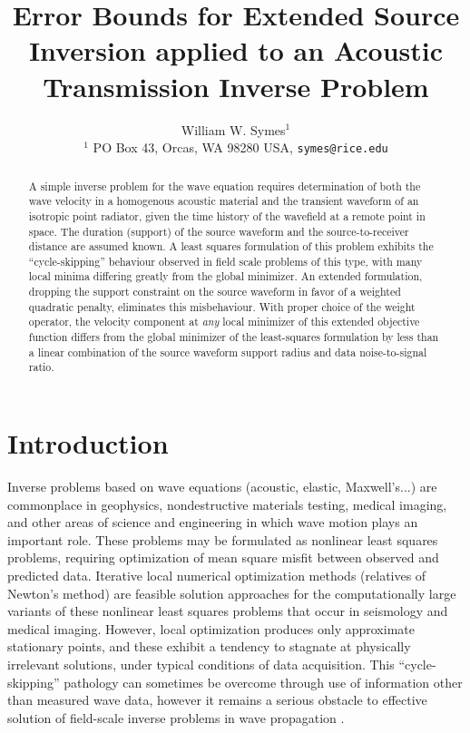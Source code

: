 \title{Error Bounds for Extended Source Inversion applied to an Acoustic Transmission Inverse Problem}
\author[Symes]{William W. Symes$^1$\\
$^1$ PO Box 43, Orcas, WA 98280 USA, {\tt symes@rice.edu}}

\maketitle
\begin{abstract}
  A simple inverse problem for the wave equation requires
  determination of both the wave velocity in a homogenous acoustic
  material and the transient waveform of an isotropic point radiator,
  given the time history of the wavefield at a remote point in
  space. The duration (support) of the source waveform and the
  source-to-receiver distance are assumed known. A least squares
  formulation of this problem exhibits the ``cycle-skipping''
  behaviour observed in field scale problems of this type, with many
  local minima differing greatly from the global minimizer. An
  extended formulation, dropping the support constraint on the source
  waveform in favor of a weighted quadratic penalty, eliminates this
  misbehaviour. With proper choice of the weight operator, the
  velocity component at {\em any} local minimizer of this extended
  objective function differs from the global
  minimizer of the least-squares formulation by less than a linear
  combination of the source waveform support radius and data
  noise-to-signal ratio.

\end{abstract}

\section{Introduction}
Inverse problems based on wave equations (acoustic, elastic,
Maxwell's...) are commonplace in geophysics, nondestructive materials
testing, medical imaging, and other areas of science and engineering
in which wave motion plays an important role. These problems may be
formulated as nonlinear least squares problems, requiring optimization
of mean square misfit between observed and predicted data. Iterative
local numerical optimization methods (relatives of Newton's method)
are feasible solution approaches for the computationally large
variants of these nonlinear least squares problems that occur in
seismology and medical imaging. However, local optimization produces
only approximate stationary points, and these exhibit a tendency to
stagnate at physically irrelevant solutions, under typical conditions
of data acquisition. This ``cycle-skipping''
pathology can sometimes be overcome through use of information other than
measured wave data, however it remains a serious obstacle to effective
solution of field-scale inverse problems in wave propagation
\cite[]{GauTarVir:86,VirieuxOperto:09,Fichtner:10,Plessix:10,Schuster:17}.

